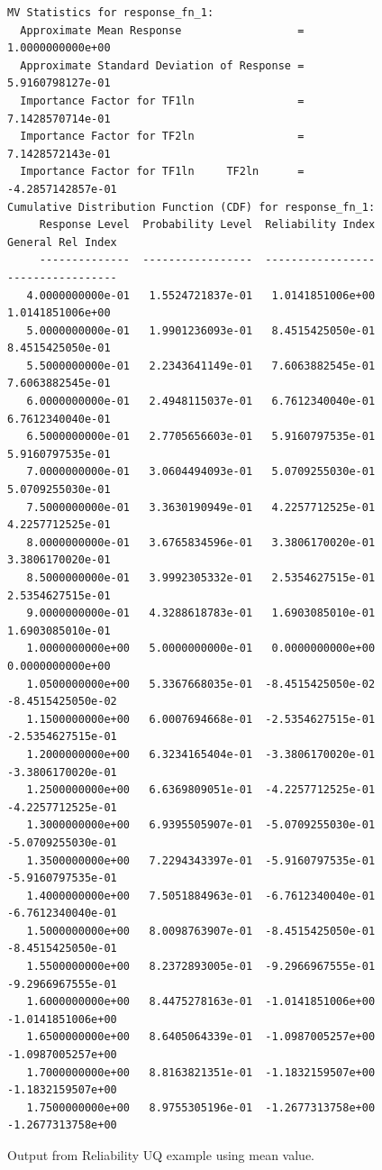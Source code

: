 \begin{figure}[htbp!]
\begin{bigbox}
\begin{small}
\begin{verbatim}
MV Statistics for response_fn_1:
  Approximate Mean Response                  =  1.0000000000e+00
  Approximate Standard Deviation of Response =  5.9160798127e-01
  Importance Factor for TF1ln                =  7.1428570714e-01
  Importance Factor for TF2ln                =  7.1428572143e-01
  Importance Factor for TF1ln     TF2ln      = -4.2857142857e-01
Cumulative Distribution Function (CDF) for response_fn_1:
     Response Level  Probability Level  Reliability Index  General Rel Index
     --------------  -----------------  -----------------  -----------------
   4.0000000000e-01   1.5524721837e-01   1.0141851006e+00   1.0141851006e+00
   5.0000000000e-01   1.9901236093e-01   8.4515425050e-01   8.4515425050e-01
   5.5000000000e-01   2.2343641149e-01   7.6063882545e-01   7.6063882545e-01
   6.0000000000e-01   2.4948115037e-01   6.7612340040e-01   6.7612340040e-01
   6.5000000000e-01   2.7705656603e-01   5.9160797535e-01   5.9160797535e-01
   7.0000000000e-01   3.0604494093e-01   5.0709255030e-01   5.0709255030e-01
   7.5000000000e-01   3.3630190949e-01   4.2257712525e-01   4.2257712525e-01
   8.0000000000e-01   3.6765834596e-01   3.3806170020e-01   3.3806170020e-01
   8.5000000000e-01   3.9992305332e-01   2.5354627515e-01   2.5354627515e-01
   9.0000000000e-01   4.3288618783e-01   1.6903085010e-01   1.6903085010e-01
   1.0000000000e+00   5.0000000000e-01   0.0000000000e+00   0.0000000000e+00
   1.0500000000e+00   5.3367668035e-01  -8.4515425050e-02  -8.4515425050e-02
   1.1500000000e+00   6.0007694668e-01  -2.5354627515e-01  -2.5354627515e-01
   1.2000000000e+00   6.3234165404e-01  -3.3806170020e-01  -3.3806170020e-01
   1.2500000000e+00   6.6369809051e-01  -4.2257712525e-01  -4.2257712525e-01
   1.3000000000e+00   6.9395505907e-01  -5.0709255030e-01  -5.0709255030e-01
   1.3500000000e+00   7.2294343397e-01  -5.9160797535e-01  -5.9160797535e-01
   1.4000000000e+00   7.5051884963e-01  -6.7612340040e-01  -6.7612340040e-01
   1.5000000000e+00   8.0098763907e-01  -8.4515425050e-01  -8.4515425050e-01
   1.5500000000e+00   8.2372893005e-01  -9.2966967555e-01  -9.2966967555e-01
   1.6000000000e+00   8.4475278163e-01  -1.0141851006e+00  -1.0141851006e+00
   1.6500000000e+00   8.6405064339e-01  -1.0987005257e+00  -1.0987005257e+00
   1.7000000000e+00   8.8163821351e-01  -1.1832159507e+00  -1.1832159507e+00
   1.7500000000e+00   8.9755305196e-01  -1.2677313758e+00  -1.2677313758e+00
\end{verbatim}
\end{small}
\end{bigbox}
\caption{Output from Reliability UQ example using mean value.}
\label{uq:rel_output_mv}
\end{figure}


